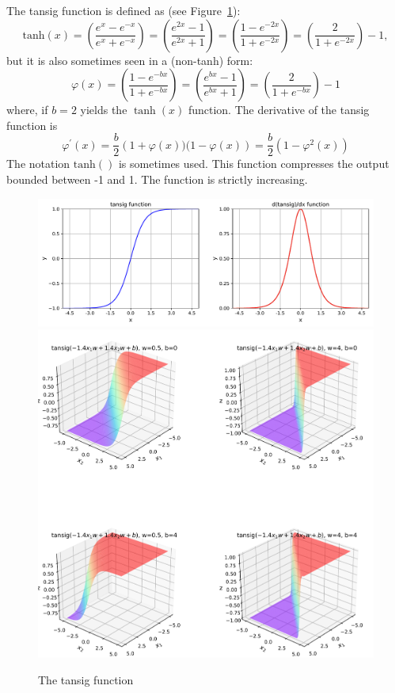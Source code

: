 The tansig function is defined as (see Figure~\ref{fig:tansig}):
\begin{equation}
\textrm{tanh}(x)
=\left(\frac{e^{x}-e^{-x}}{e^{x}+e^{-x}}\right)
=\left(\frac{e^{2x}-1}{e^{2x}+1}\right)
=\left(\frac{1-e^{-2x}}{1+e^{-2x}}\right)
=\left(\frac{2}{1+e^{-2x}}\right)-1,
\end{equation}  
but it is also sometimes seen in a (non-tanh) form:
\begin{equation}
\varphi(x)
=\left(\frac{1-e^{-bx}}{1+e^{-bx}}\right)
=\left(\frac{e^{bx}-1}{e^{bx}+1}\right)
=\left(\frac{2}{1+e^{-bx}}\right)-1
\end{equation}  
where, if $b=2$ yields the $\tanh(x)$ function.
The derivative of the tansig function is 
\begin{equation}
 \varphi^\prime(x)
 = \frac{b}{2} \left(1+\varphi(x))(1-\varphi(x)\right)
 = \frac{b}{2}\left(1-\varphi^2(x)\right)
\end{equation}
The notation $\textrm{tanh}()$ is sometimes used.
This function compresses the output bounded between -1 and 1. The function is strictly increasing. 



\begin{figure}[p]
\centering
\includegraphics[width=\textwidth]{pic/tansig01}
\includegraphics[width=\textwidth]{pic/tansig02}
\caption{The tansig function }
\label{fig:tansig}
\end{figure}



